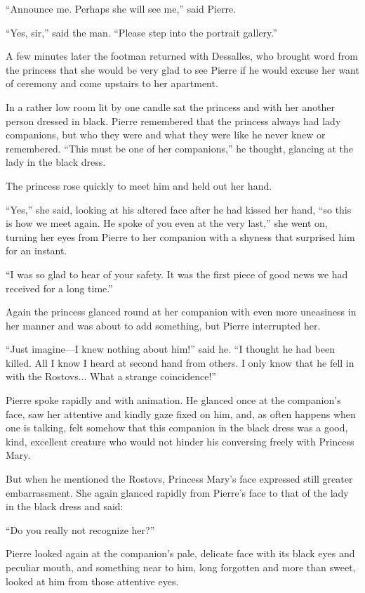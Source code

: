 ``Announce me. Perhaps she will see me,'' said Pierre.

``Yes, sir,'' said the man. ``Please step into the portrait
gallery.''

A few minutes later the footman returned with Dessalles, who
brought word from the princess that she would be very glad to see
Pierre if he would excuse her want of ceremony and come upstairs
to her apartment.

In a rather low room lit by one candle sat the princess and with
her another person dressed in black. Pierre remembered that the
princess always had lady companions, but who they were and what
they were like he never knew or remembered. ``This must be one of
her companions,'' he thought, glancing at the lady in the black
dress.

The princess rose quickly to meet him and held out her hand.

``Yes,'' she said, looking at his altered face after he had
kissed her hand, ``so this is how we meet again. He spoke of you
even at the very last,'' she went on, turning her eyes from
Pierre to her companion with a shyness that surprised him for an
instant.

``I was so glad to hear of your safety. It was the first piece of
good news we had received for a long time.''

Again the princess glanced round at her companion with even more
uneasiness in her manner and was about to add something, but
Pierre interrupted her.

``Just imagine---I knew nothing about him!'' said he. ``I thought
he had been killed. All I know I heard at second hand from
others. I only know that he fell in with the Rostovs... What a
strange coincidence!''

Pierre spoke rapidly and with animation. He glanced once at the
companion's face, saw her attentive and kindly gaze fixed on him,
and, as often happens when one is talking, felt somehow that this
companion in the black dress was a good, kind, excellent creature
who would not hinder his conversing freely with Princess Mary.

But when he mentioned the Rostovs, Princess Mary's face expressed
still greater embarrassment. She again glanced rapidly from
Pierre's face to that of the lady in the black dress and said:

``Do you really not recognize her?''

Pierre looked again at the companion's pale, delicate face with
its black eyes and peculiar mouth, and something near to him,
long forgotten and more than sweet, looked at him from those
attentive eyes.

